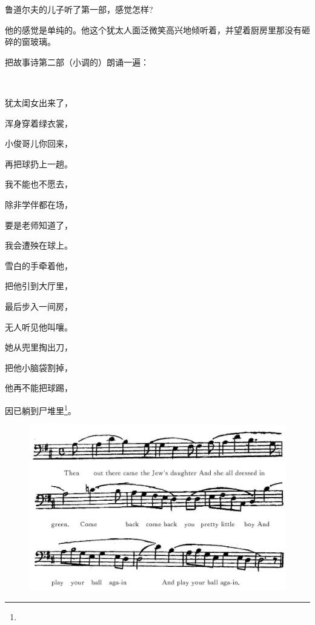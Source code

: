 \par 鲁道尔夫的儿子听了第一部，感觉怎样?
\par 他的感觉是单纯的。他这个犹太人面泛微笑高兴地倾听着，并望着厨房里那没有砸碎的窗玻璃。
\par 把故事诗第二部（小调的）朗诵一遍：
\par  
\par 犹太闺女出来了，
\par 浑身穿着绿衣裳，
\par 小俊哥儿你回来，
\par 再把球扔上一趟。
\par 我不能也不愿去，
\par 除非学伴都在场，
\par 要是老师知道了，
\par 我会遭殃在球上。
\par 雪白的手牵着他，
\par 把他引到大厅里，
\par 最后步入一间房，
\par 无人听见他叫嚷。
\par 她从兜里掏出刀，
\par 把他小脑袋割掉，
\par 他再不能把球踢，
\par 因已躺到尸堆里\footnote{}。

\begin{figure}[htb]
    \includegraphics[scale=0.4]{picture/尤利西斯3.jpeg}
\end{figure}

